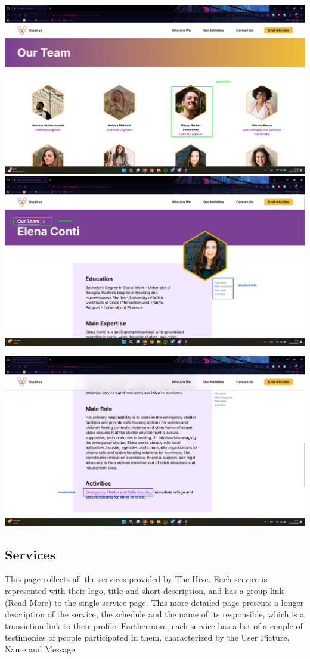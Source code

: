 \vspace{1em}
\includegraphics[width=0.5\linewidth]{img/design-document/website-screenshots/teampage.png}
\includegraphics[width=0.5\linewidth]{img/design-document/website-screenshots/personpage-1.png}
\begin{center}
    \includegraphics[width=0.5\linewidth]{img/design-document/website-screenshots/personpage-2.png}
\end{center}

\subsection{Services}
This page collects all the services provided by The Hive. Each service is represented with their logo, title and short description,
and has a group link (Read More) to the single service page. This more detailed page presents a longer description of the service, the schedule and 
the name of its responsible, which is a transiction link to their profile. Furthermore, each service has a list of a couple of testimonies of people
participated in them, characterized by the User Picture, Name and Message.

